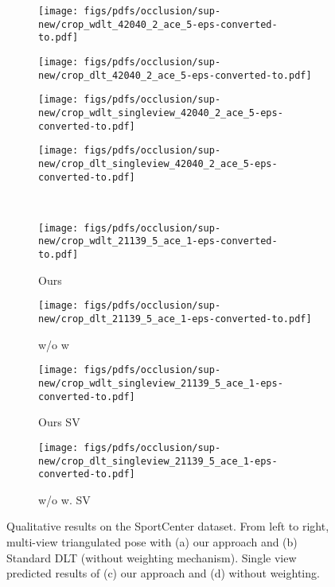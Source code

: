 \documentclass[runningheads]{llncs}
\begin{document}
\begin{figure*}
	
	\begin{subfigure}[b]{0.235\linewidth}        \centering
		\texttt{[image: figs/pdfs/occlusion/sup-new/crop\_wdlt\_42040\_2\_ace\_5-eps-converted-to.pdf]}
\end{subfigure}
	\begin{subfigure}[b]{0.235\linewidth}        \centering
		\texttt{[image: figs/pdfs/occlusion/sup-new/crop\_dlt\_42040\_2\_ace\_5-eps-converted-to.pdf]}
\end{subfigure}
	\begin{subfigure}[b]{0.235\linewidth}        \centering
		\texttt{[image: figs/pdfs/occlusion/sup-new/crop\_wdlt\_singleview\_42040\_2\_ace\_5-eps-converted-to.pdf]}
\end{subfigure}
	\begin{subfigure}[b]{0.235\linewidth}        \centering
		\texttt{[image: figs/pdfs/occlusion/sup-new/crop\_dlt\_singleview\_42040\_2\_ace\_5-eps-converted-to.pdf]}
\end{subfigure} \\ \vspace{-3mm}
	
	\begin{subfigure}[b]{0.235\linewidth}        \centering
		\texttt{[image: figs/pdfs/occlusion/sup-new/crop\_wdlt\_21139\_5\_ace\_1-eps-converted-to.pdf]}
		\caption{Ours}
\end{subfigure}
	\begin{subfigure}[b]{0.235\linewidth}        \centering
		\texttt{[image: figs/pdfs/occlusion/sup-new/crop\_dlt\_21139\_5\_ace\_1-eps-converted-to.pdf]}
		\caption{w/o w}
\end{subfigure}
	\begin{subfigure}[b]{0.235\linewidth}        \centering
		\texttt{[image: figs/pdfs/occlusion/sup-new/crop\_wdlt\_singleview\_21139\_5\_ace\_1-eps-converted-to.pdf]}
		\caption{Ours SV}
\end{subfigure}
	\begin{subfigure}[b]{0.235\linewidth}        \centering
		\texttt{[image: figs/pdfs/occlusion/sup-new/crop\_dlt\_singleview\_21139\_5\_ace\_1-eps-converted-to.pdf]}
		\caption{\small w/o w. SV}
\end{subfigure}

	\vspace{-0.3cm}
	\caption{\small Qualitative results on the SportCenter dataset. From left to right, multi-view triangulated pose with (a) our approach and (b) Standard DLT (without weighting mechanism). Single view predicted results of (c) our approach and (d) without weighting. }
	\label{fig:occlusion_images_3}
\end{figure*} \begin{figure*}
	\centering
	

\end{figure*}
\end{document}
